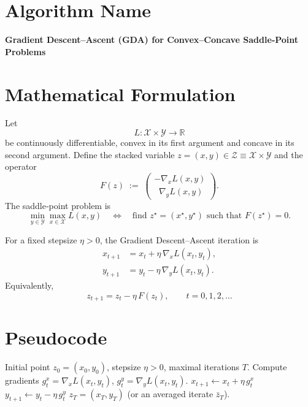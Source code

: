 \documentclass{article}
\newcommand{\grad}{\nabla}
\newcommand{\R}{\mathbb{R}}
\begin{document}
\section*{Algorithm Name}
\textbf{Gradient Descent–Ascent (GDA) for Convex–Concave Saddle‑Point Problems}

\section*{Mathematical Formulation}
Let 
\[
L:\mathcal{X}\times\mathcal{Y}\rightarrow\R
\]
be continuously differentiable, convex in its first argument and concave in its second argument.  
Define the stacked variable $z=(x,y)\in\mathcal{Z}\equiv\mathcal{X}\times\mathcal{Y}$ and the operator
\[
F(z)\;:=\;\begin{pmatrix}
-\grad_{x}L(x,y)\\[2mm]
\;\;\grad_{y}L(x,y)
\end{pmatrix}.
\]
The saddle‑point problem is
\[
\min_{y\in\mathcal{Y}}\max_{x\in\mathcal{X}} L(x,y)
\quad\Longleftrightarrow\quad
\text{find }z^{\star}=(x^{\star},y^{\star})\text{ such that }F(z^{\star})=0 .
\]

For a fixed stepsize $\eta>0$, the Gradient Descent–Ascent iteration is
\[
\boxed{
\begin{aligned}
x_{t+1}&=x_{t}+ \eta\,\grad_{x}L(x_{t},y_{t}) ,\\[1mm]
y_{t+1}&=y_{t}- \eta\,\grad_{y}L(x_{t},y_{t}) .
\end{aligned}}
\tag{GDA}
\]
Equivalently,
\[
z_{t+1}=z_{t}-\eta\,F(z_{t}),\qquad t=0,1,2,\dots
\]

\section*{Pseudocode}
\begin{algorithm}[H]
\caption{Gradient Descent–Ascent (GDA)}\label{alg:gda}
\begin{algorithmic}[1]
\Require Initial point $z_{0}=(x_{0},y_{0})$, stepsize $\eta>0$, maximal iterations $T$.
    \State Compute gradients $g^{x}_{t}= \grad_{x}L(x_{t},y_{t})$, \; $g^{y}_{t}= \grad_{y}L(x_{t},y_{t})$.
    \State $x_{t+1}\gets x_{t}+ \eta\, g^{x}_{t}$ 
    \State $y_{t+1}\gets y_{t}- \eta\, g^{y}_{t}$ 
\EndFor
\State \Return $z_{T}=(x_{T},y_{T})$ (or an averaged iterate $\bar z_{T}$).
\end{algorithmic}
\end{algorithm}
\end{document}
